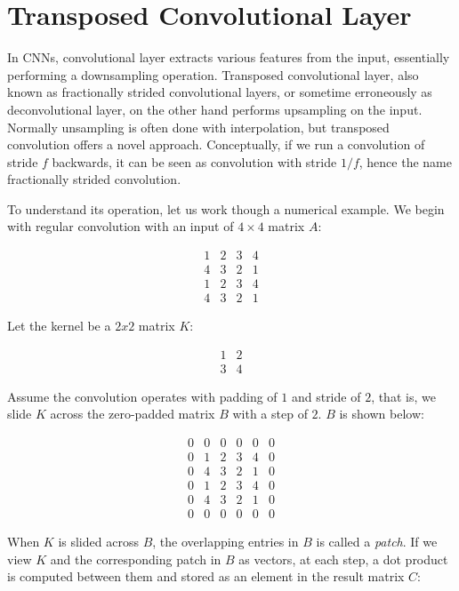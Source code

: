 
\chapter{Transposed Convolutional Layer}

In CNNs, convolutional layer extracts various features from the input, essentially performing a downsampling
operation. Transposed convolutional layer, also known as fractionally strided convolutional layers, or sometime
erroneously as deconvolutional layer, on the other hand performs upsampling on the input. Normally unsampling
is often done with interpolation, but transposed convolution offers a novel approach. Conceptually,
if we run a convolution of stride $f$ backwards, it can be seen as convolution with stride $1/f$, hence the
name fractionally strided convolution.

To understand its operation, let us work though a numerical example. We begin with regular convolution
with an input of $4 \times 4$ matrix $A$:

$$
\begin{matrix}
  1 & 2 & 3 & 4 \\
  4 & 3 & 2 & 1 \\
  1 & 2 & 3 & 4 \\
  4 & 3 & 2 & 1
\end{matrix}
$$

Let the kernel be a $2x2$ matrix $K$:

$$
\begin{matrix}
  1 & 2 \\
  3 & 4
\end{matrix}
$$

Assume the convolution operates with padding of $1$ and stride of $2$, that is, we slide $K$ across the
zero-padded matrix $B$ with a step of $2$. $B$ is shown below:

$$
\begin{matrix}
  0 & 0 & 0 & 0 & 0 & 0 \\
  0 & 1 & 2 & 3 & 4 & 0 \\
  0 & 4 & 3 & 2 & 1 & 0 \\
  0 & 1 & 2 & 3 & 4 & 0 \\
  0 & 4 & 3 & 2 & 1 & 0 \\
  0 & 0 & 0 & 0 & 0 & 0
\end{matrix}
$$

When $K$ is slided across $B$, the overlapping entries in $B$ is called a \textit{patch}. If we view $K$ and
the corresponding patch in $B$ as vectors, at each step, a dot product is computed between them and stored as
an element in the result matrix $C$:


